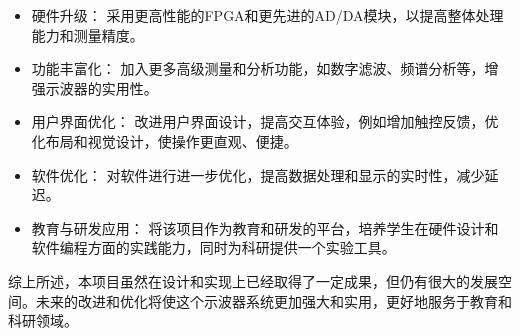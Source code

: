 \documentclass[lang=cn,a4paper,newtx]{elegantpaper}
\begin{document}
\begin{itemize}
	\item 硬件升级： 采用更高性能的FPGA和更先进的AD/DA模块，以提高整体处理能力和测量精度。
	\item 功能丰富化： 加入更多高级测量和分析功能，如数字滤波、频谱分析等，增强示波器的实用性。
	\item 用户界面优化： 改进用户界面设计，提高交互体验，例如增加触控反馈，优化布局和视觉设计，使操作更直观、便捷。
	\item 软件优化： 对软件进行进一步优化，提高数据处理和显示的实时性，减少延迟。
	\item 教育与研发应用： 将该项目作为教育和研发的平台，培养学生在硬件设计和软件编程方面的实践能力，同时为科研提供一个实验工具。
\end{itemize}

综上所述，本项目虽然在设计和实现上已经取得了一定成果，但仍有很大的发展空间。未来的改进和优化将使这个示波器系统更加强大和实用，更好地服务于教育和科研领域。
\end{document}
